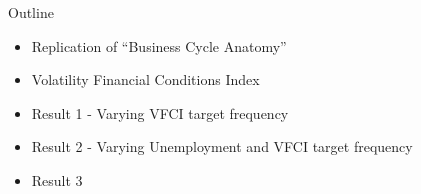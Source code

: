 \begin{frame}{Outline}
    
    \label{outline-slide-1}

    \begin{itemize}
        
        \item Replication of ``Business Cycle Anatomy''
        
        \item Volatility Financial Conditions Index
        
        \item Result 1 - Varying VFCI target frequency
        
        \item Result 2 - Varying Unemployment and VFCI target frequency
        
        \item Result 3

    \end{itemize}

\end{frame}

